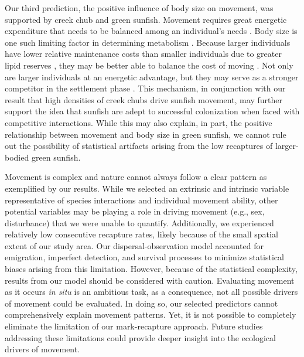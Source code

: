 \documentclass[11pt, class=article, crop=false]{standalone}
\begin{document}
Our third prediction, the positive influence of body size on movement, was  supported by creek chub and green sunfish. Movement requires great energetic expenditure that needs to be balanced among an individual’s needs \citep{boisclairImportanceActivityBioenergetics1989, joblingBioenergeticsFeedIntake1993, cookeMovementEcologyFishes2022}. Body size is one such limiting factor in determining metabolism \citep{beamish2SwimmingCapacity1978, rubio-graciaSizerelatedEffectsInfluence2020}. Because larger individuals have lower relative maintenance costs than smaller individuals due to greater lipid reserves \citep{brownSizeMattersTest2004, krauseRefugeUseFish1998, kannoBodyConditionMetrics2023}, they may be better able to balance the cost of moving \citep{schlagelMovementmediatedCommunityAssembly2020}. Not only are larger individuals at an energetic advantage, but they may serve as a stronger competitor in the settlement phase \citep{rasmussenIndividualMovementStream2017}. This mechanism, in conjunction with our result that high densities of creek chubs drive sunfish movement, may further support the idea that sunfish are adept to successful colonization when faced with competitive interactions. While this may also explain, in part, the positive relationship between movement and body size in green sunfish, we cannot rule out the possibility of statistical artifacts arising from the low recaptures of larger-bodied green sunfish. 

Movement is complex and nature cannot always follow a clear pattern as exemplified by our results. While we selected an extrinsic and intrinsic variable representative of species interactions and individual movement ability, other potential variables may be playing a role in driving movement (e.g., sex, disturbance) that we were unable to quantify. Additionally, we experienced relatively low consecutive recapture rates, likely because of the small spatial extent of our study area. Our dispersal-observation model accounted for emigration, imperfect detection, and survival processes to minimize statistical biases arising from this limitation. However, because of the statistical complexity, results from our model should be considered with caution. Evaluating movement as it occurs \textit{in situ} is an ambitious task, as a consequence, not all possible drivers of movement could be evaluated. In doing so, our selected predictors cannot comprehensively explain movement patterns. Yet, it is not possible to completely eliminate the limitation of our mark-recapture approach. Future studies addressing these limitations could provide deeper insight into the ecological drivers of movement.
\end{document}
